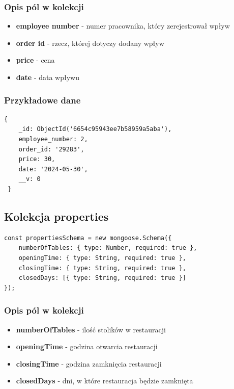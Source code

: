\documentclass[12pt]{article}
\begin{document}
\subsubsection{Opis pól w kolekcji}

\begin{itemize}
	\item \textbf{employee number} - numer pracownika, który zerejestrował wpływ
	\item \textbf{order id} - rzecz, której dotyczy dodany wpływ
	\item \textbf{price} - cena
	\item \textbf{date} - data wpływu
\end{itemize}

\subsubsection{Przykładowe dane}
\begin{lstlisting}[]
 {
    _id: ObjectId('6654c95943ee7b58959a5aba'),
    employee_number: 2,
    order_id: '29283',
    price: 30,
    date: '2024-05-30',
    __v: 0
 }
\end{lstlisting}

\newpage
\begin{samepage}
\subsection{Kolekcja properties}

\begin{lstlisting}[caption={Properties}]
const propertiesSchema = new mongoose.Schema({
    numberOfTables: { type: Number, required: true },
    openingTime: { type: String, required: true },
    closingTime: { type: String, required: true },
    closedDays: [{ type: String, required: true }]
});
\end{lstlisting}
\end{samepage}
\subsubsection{Opis pól w kolekcji}

\begin{itemize}
	\item \textbf{numberOfTables} - ilość stolików w restauracji
	\item \textbf{openingTime} - godzina otwarcia restauracji
	\item \textbf{closingTime} - godzina zamknięcia restauracji
	\item \textbf{closedDays} - dni, w które restauracja będzie zamknięta
\end{itemize}
\end{document}
